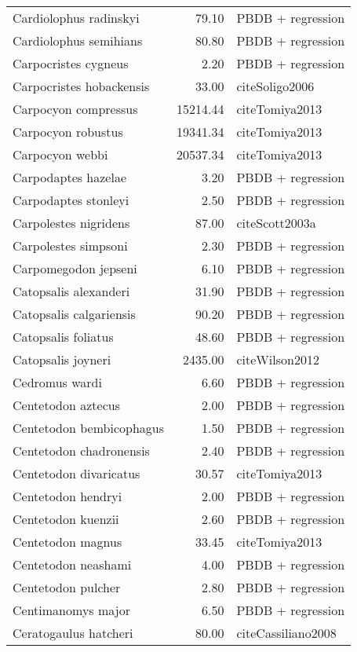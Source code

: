 \begin{table}[ht]
\begin{tabular}{lrl}
  Cardiolophus radinskyi & 79.10 & PBDB + regression \\ 
  Cardiolophus semihians & 80.80 & PBDB + regression \\ 
  Carpocristes cygneus & 2.20 & PBDB + regression \\ 
  Carpocristes hobackensis & 33.00 & cite{Soligo2006} \\ 
  Carpocyon compressus & 15214.44 & cite{Tomiya2013} \\ 
  Carpocyon robustus & 19341.34 & cite{Tomiya2013} \\ 
  Carpocyon webbi & 20537.34 & cite{Tomiya2013} \\ 
  Carpodaptes hazelae & 3.20 & PBDB + regression \\ 
  Carpodaptes stonleyi & 2.50 & PBDB + regression \\ 
  Carpolestes nigridens & 87.00 & cite{Scott2003a} \\ 
  Carpolestes simpsoni & 2.30 & PBDB + regression \\ 
  Carpomegodon jepseni & 6.10 & PBDB + regression \\ 
  Catopsalis alexanderi & 31.90 & PBDB + regression \\ 
  Catopsalis calgariensis & 90.20 & PBDB + regression \\ 
  Catopsalis foliatus & 48.60 & PBDB + regression \\ 
  Catopsalis joyneri & 2435.00 & cite{Wilson2012} \\ 
  Cedromus wardi & 6.60 & PBDB + regression \\ 
  Centetodon aztecus & 2.00 & PBDB + regression \\ 
  Centetodon bembicophagus & 1.50 & PBDB + regression \\ 
  Centetodon chadronensis & 2.40 & PBDB + regression \\ 
  Centetodon divaricatus & 30.57 & cite{Tomiya2013} \\ 
  Centetodon hendryi & 2.00 & PBDB + regression \\ 
  Centetodon kuenzii & 2.60 & PBDB + regression \\ 
  Centetodon magnus & 33.45 & cite{Tomiya2013} \\ 
  Centetodon neashami & 4.00 & PBDB + regression \\ 
  Centetodon pulcher & 2.80 & PBDB + regression \\ 
  Centimanomys major & 6.50 & PBDB + regression \\ 
  Ceratogaulus hatcheri & 80.00 & cite{Cassiliano2008} \\ 

\end{tabular}
\end{table}
